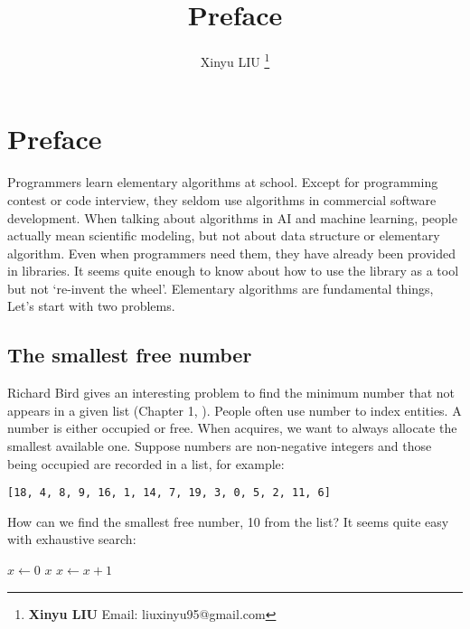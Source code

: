 \documentclass[b5paper]{article}
\begin{document}
\title{Preface}

\author{Xinyu LIU
\thanks{{\bfseries Xinyu LIU} \newline
  Email: liuxinyu95@gmail.com \newline}
  }

\maketitle
\fi


\chapter*{Preface}

Programmers learn elementary algorithms at school. Except for programming contest or code interview, they seldom use algorithms in commercial software development. When talking about algorithms in AI and machine learning, people actually mean scientific modeling, but not about data structure or elementary algorithm. Even when programmers need them, they have already been provided in libraries. It seems quite enough to know about how to use the library as a tool but not `re-invent the wheel'. Elementary algorithms are fundamental things, Let's start with two problems.

\section*{The smallest free number}
\label{min-free} 

Richard Bird gives an interesting problem to find the minimum number that not appears in a given list (Chapter 1, \cite{Bird-book}). People often use number to index entities. A number is either occupied or free. When acquires, we want to always allocate the smallest available one. Suppose numbers are non-negative integers and those being occupied are recorded in a list, for example:

\begin{Verbatim}[fontsize=\footnotesize]
[18, 4, 8, 9, 16, 1, 14, 7, 19, 3, 0, 5, 2, 11, 6]
\end{Verbatim}

How can we find the smallest free number, 10 from the list? It seems quite easy with exhaustive search:

\begin{algorithmic}[1]
  \State $x \gets 0$
  \Loop
      \State \Return $x$
    \Else
      \State $x \gets x + 1$
    \EndIf
  \EndLoop
\EndFunction
\end{algorithmic}
\end{document}
